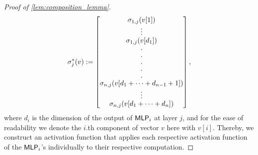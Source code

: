 \begin{proof}[Proof of \cref{lem:composition_lemma}]
    \begin{equation*}
        \sigma^*_j(v) := \begin{bmatrix}
            \sigma_{1,j}(v[1])\\
            \vspace*{-1pt}\vbox{\baselineskip=4pt \lineskiplimit=0pt \kern6pt \hbox{.}\hbox{.}\hbox{.}}\\
            \sigma_{1,j}(v[d_1])\\
            \vspace*{-1pt}\vbox{\baselineskip=10pt \lineskiplimit=0pt \kern6pt \hbox{.}\hbox{.}\hbox{.}\hbox{.}\hbox{.}}\\
            \sigma_{n,j}(v[d_1 + \dots + d_{n-1} + 1])\\
            \vspace*{-1pt}\vbox{\baselineskip=4pt \lineskiplimit=0pt \kern6pt \hbox{.}\hbox{.}\hbox{.}}\\
            \sigma_{n,j}(v[d_1 + \dots + d_{n}])
        \end{bmatrix},
    \end{equation*}
    where $d_i$ is the dimension of the output of $\textsf{MLP}_i$ at layer $j$, and for the ease of readability we denote the $i$.th component of vector $v$ here with $v[i]$. Thereby, we construct an activation function that applies each respective activation function of the $\textsf{MLP}_i$'s individually to their respective computation.
\end{proof}



